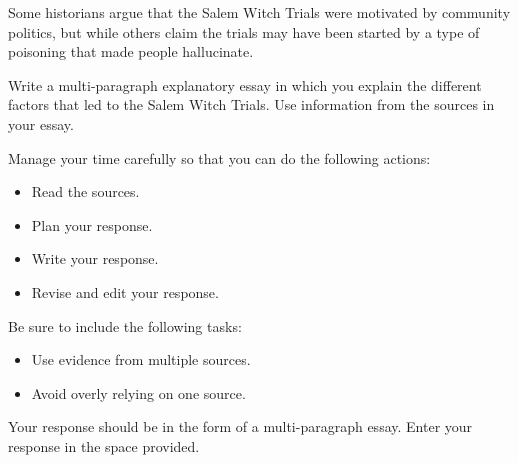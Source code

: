 \documentclass[12pt]{article}
\begin{document}
\vspace{1em}
\begin{tcolorbox}[colframe=black!60, colback=white, 
coltitle=black, colbacktitle=black!15, fonttitle=\bfseries\Large, 
title=Example Test Prompt, halign title=center, left=10pt, right=10pt, top=10pt, bottom=15pt]
Some historians argue that the Salem Witch Trials were motivated by community politics, but while others claim the trials may have been started by a type of poisoning that made people hallucinate.

\vspace{1em}

Write a multi-paragraph explanatory essay in which you explain the different factors that led to the Salem Witch Trials. Use information from the sources in your essay.

\vspace{1em}

Manage your time carefully so that you can do the following actions:
\begin{itemize}
    \item Read the sources.
    \item Plan your response.
    \item Write your response.
    \item Revise and edit your response.
\end{itemize}
Be sure to include the following tasks:
\begin{itemize}

    \item Use evidence from multiple sources.
    \item Avoid overly relying on one source.
\end{itemize}
Your response should be in the form of a multi-paragraph essay. Enter your response in the space provided.
\end{tcolorbox}

\vspace{1em}
\end{document}
